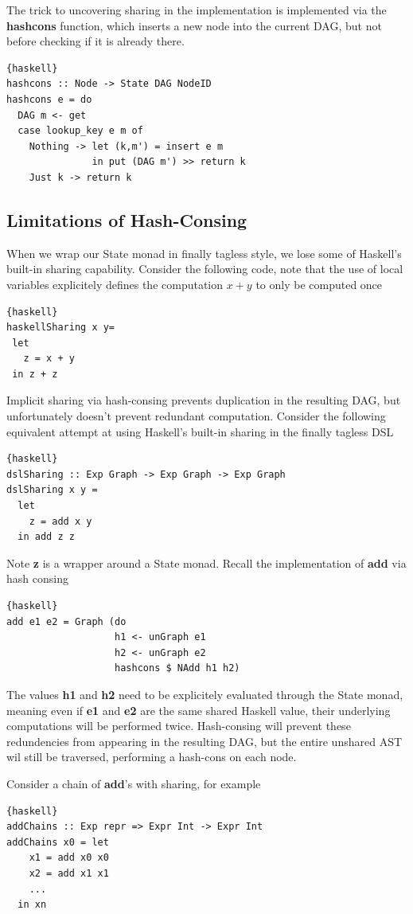 \documentclass[runningheads]{llncs}
\begin{document}
The trick to uncovering sharing in the implementation is implemented via the
{\bf hashcons} function, which inserts a new node into the current DAG, but not
before checking if it is already there.
\begin{lstlisting}{haskell}
hashcons :: Node -> State DAG NodeID
hashcons e = do
  DAG m <- get
  case lookup_key e m of
    Nothing -> let (k,m') = insert e m
               in put (DAG m') >> return k
    Just k -> return k
\end{lstlisting}

\subsection{Limitations of Hash-Consing}

When we wrap our State monad in finally tagless style, we lose some of Haskell's
built-in sharing capability. Consider the following code, note that the use of
local variables explicitely defines the computation $x + y$ to only be computed
once
\begin{lstlisting}{haskell}
haskellSharing x y=
 let
   z = x + y
 in z + z
\end{lstlisting}

Implicit sharing via hash-consing prevents duplication in the resulting DAG, but
unfortunately doesn't prevent redundant computation. Consider the following
equivalent attempt at using Haskell's built-in sharing in the finally tagless DSL
\begin{lstlisting}{haskell}
dslSharing :: Exp Graph -> Exp Graph -> Exp Graph
dslSharing x y =
  let
    z = add x y
  in add z z
\end{lstlisting}
Note {\bf z} is a wrapper around a State monad. Recall the implementation of
{\bf add} via hash consing
\begin{lstlisting}{haskell}
add e1 e2 = Graph (do
                   h1 <- unGraph e1
                   h2 <- unGraph e2
                   hashcons $ NAdd h1 h2)
\end{lstlisting}
The values {\bf h1} and {\bf h2} need to be explicitely evaluated through the
State monad, meaning even if {\bf e1} and {\bf e2} are the same shared Haskell
value, their underlying computations will be performed twice. Hash-consing will
prevent these redundencies from appearing in the resulting DAG, but the entire
unshared AST wil still be traversed, performing a hash-cons on each node.

Consider a chain of {\bf add}'s  with sharing, for example
\begin{lstlisting}{haskell}
addChains :: Exp repr => Expr Int -> Expr Int
addChains x0 = let
    x1 = add x0 x0
    x2 = add x1 x1
    ...
  in xn
\end{lstlisting}
\end{document}
